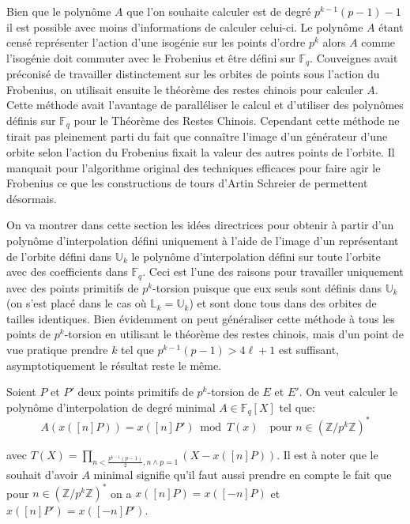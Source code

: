 \documentclass[10pt,a4paper]{book}
\theoremstyle{plain}
\theoremstyle{definition}
\theoremstyle{definition}
\theoremstyle{definition}
\theoremstyle{definition}
\theoremstyle{remark}
\theoremstyle{remark}
\begin{document}
Bien que le polynôme $A$ que l'on souhaite calculer est de degré $p^{k-1}(p-1)-1$ il est possible avec moins d'informations de calculer celui-ci. Le polynôme $A$ étant censé représenter l'action d'une isogénie sur les points d'ordre $p^k$ alors $A$ comme l'isogénie doit commuter avec le Frobenius et être défini sur $\mathbb{F}_q$. Couveignes \cite{Couveignes96} avait préconisé de travailler distinctement sur les orbites de points sous l'action du Frobenius, on utilisait ensuite le théorème des restes chinois pour calculer $A$. Cette méthode avait l'avantage de paralléliser le calcul et d'utiliser des polynômes définis sur $\mathbb{F}_q$ pour le Théorème des Restes Chinois. Cependant cette méthode ne tirait pas pleinement parti du fait que connaître l'image d'un générateur d'une orbite selon l'action du Frobenius fixait la valeur des autres points de l'orbite. Il manquait pour l'algorithme original des techniques efficaces pour faire agir le Frobenius ce que les constructions de tours d'Artin Schreier de \cite{DeFeo-Shost'12} permettent désormais.

On va montrer dans cette section les idées directrices pour obtenir à partir d'un polynôme d'interpolation défini uniquement à l'aide de l'image d'un représentant de l'orbite défini dans $\mathbb{U}_k$ le polynôme d'interpolation défini sur toute l'orbite avec des coefficients dans $\mathbb{F}_q$. Ceci est l'une des raisons pour travailler uniquement avec des points primitifs de $p^k$-torsion puisque que eux seuls sont définis dans $\mathbb{U}_k$ (on s'est placé dans le cas où $\mathbb{L}_k = \mathbb{U}_k$) et sont donc tous dans des orbites de tailles identiques. Bien évidemment on peut généraliser cette méthode à tous les points de $p^k$-torsion en utilisant le théorème des restes chinois, mais d'un point de vue pratique prendre $k$ tel que $p^{k-1}(p-1) > 4 \ell +1$ est suffisant, asymptotiquement le résultat reste le même.

Soient $P$ et $P'$ deux points primitifs de $p^k$-torsion de $E$ et $E'$. On veut calculer le polynôme d'interpolation de degré minimal $A \in \mathbb{F}_q[X]$ tel que:
\begin{equation}
A(x([n]P))=x([n]P') \bmod T(x) \quad \text{pour } n \in \left( \mathbb{Z}/p^k\mathbb{Z} \right)^*
\end{equation} 

avec $T(X)= \prod_{n < \frac{p^{k-1}(p-1)}{2}, n \wedge p =1} (X-x([n]P))$. Il est à noter que le souhait d'avoir $A$ minimal signifie qu'il faut aussi prendre en compte le fait que pour $n \in \left( \mathbb{Z}/p^k \mathbb{Z} \right)^*$ on a $x([n]P)=x([-n]P)$ et $x([n]P')=x([-n]P')$. 
\end{document}
